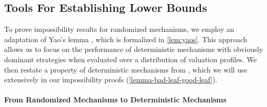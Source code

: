 \subsection{Tools For Establishing Lower Bounds}
To prove impossibility results for randomized mechanisms, we employ an adaptation of Yao's lemma \cite{Yao83}, which is formalized in \cref{lem:yaos}. This approach allows us to focus on the performance of deterministic mechanisms with obviously dominant strategies when evaluated over a distribution of valuation profiles. We then restate a property of deterministic mechanisms from \cite{Ron24}, which we will use extensively in our impossibility proofs (\cref{lemma-bad-leaf-good-leaf}).


\paragraph{From Randomized Mechanisms to Deterministic Mechanisms} 




